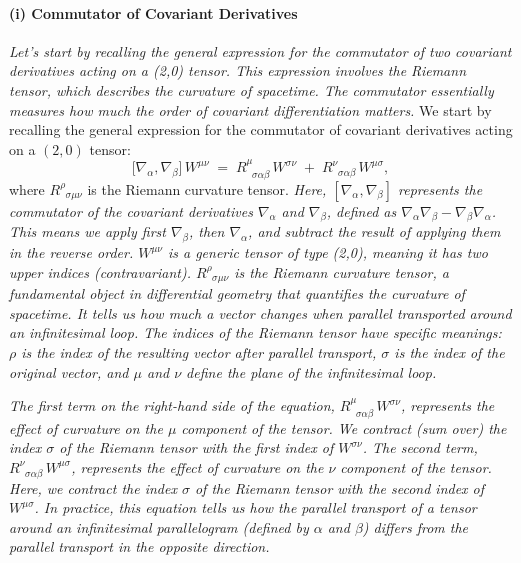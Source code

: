\paragraph{(i) Commutator of Covariant Derivatives}
\textit{Let's start by recalling the general expression for the commutator of two covariant derivatives acting on a (2,0) tensor. This expression involves the Riemann tensor, which describes the curvature of spacetime. The commutator essentially measures how much the order of covariant differentiation matters.}
We start by recalling the general expression for the commutator of covariant derivatives acting on a $(2,0)$ tensor:
\[
\bigl[\nabla_{\alpha}, \nabla_{\beta}\bigr]\,W^{\mu\nu}
\;=\;
R^\mu_{\;\;\sigma\alpha\beta}\,W^{\sigma\nu}
\;+\;
R^\nu_{\;\;\sigma\alpha\beta}\,W^{\mu\sigma},
\]
where $R^\rho_{\;\;\sigma\mu\nu}$ is the Riemann curvature tensor.
\textit{Here, \([\nabla_{\alpha}, \nabla_{\beta}]\) represents the commutator of the covariant derivatives \(\nabla_{\alpha}\) and \(\nabla_{\beta}\), defined as \(\nabla_{\alpha}\nabla_{\beta} - \nabla_{\beta}\nabla_{\alpha}\). This means we apply first \(\nabla_{\beta}\), then \(\nabla_{\alpha}\), and subtract the result of applying them in the reverse order. \(W^{\mu\nu}\) is a generic tensor of type (2,0), meaning it has two upper indices (contravariant). \(R^\rho_{\;\;\sigma\mu\nu}\) is the Riemann curvature tensor, a fundamental object in differential geometry that quantifies the curvature of spacetime. It tells us how much a vector changes when parallel transported around an infinitesimal loop. The indices of the Riemann tensor have specific meanings: \(\rho\) is the index of the resulting vector after parallel transport, \(\sigma\) is the index of the original vector, and \(\mu\) and \(\nu\) define the plane of the infinitesimal loop.}

\textit{The first term on the right-hand side of the equation, \(R^\mu_{\;\;\sigma\alpha\beta}\,W^{\sigma\nu}\), represents the effect of curvature on the \(\mu\) component of the tensor. We contract (sum over) the index \(\sigma\) of the Riemann tensor with the first index of \(W^{\sigma\nu}\). The second term, \(R^\nu_{\;\;\sigma\alpha\beta}\,W^{\mu\sigma}\), represents the effect of curvature on the \(\nu\) component of the tensor. Here, we contract the index \(\sigma\) of the Riemann tensor with the second index of \(W^{\mu\sigma}\). In practice, this equation tells us how the parallel transport of a tensor around an infinitesimal parallelogram (defined by \(\alpha\) and \(\beta\)) differs from the parallel transport in the opposite direction.}

